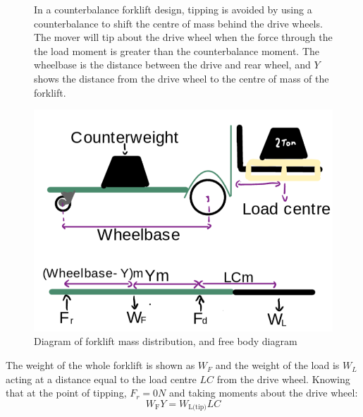 \documentclass[12pt,titlepage]{article}
\begin{document}
\begin{figure}[H]
    \centering
    \begin{minipage}[t]{0.57\textwidth}
        \vspace{0pt} %
        In a counterbalance forklift design, tipping is avoided by using a counterbalance to shift the centre of mass behind the drive wheels. The mover will tip about the drive wheel when the force through the the load moment is greater than the counterbalance moment. The wheelbase is the distance between the drive and rear wheel, and \( Y \) shows the distance from the drive wheel to the centre of mass of the forklift. 
    \end{minipage}%
    \hfill
    \begin{minipage}[t]{0.38\textwidth}
        \vspace{-30pt} 
        \centering
        \includegraphics[width=\linewidth]{Tipping Calculations 3.png}
        \vspace{-30pt}
        \caption{Diagram of forklift mass distribution, and free body diagram}
        \label{fig:x}
    \end{minipage}
\end{figure}
The weight of the whole forklift is shown as \(W_F\) and the weight of the load is \(W_L\) acting at a distance equal to the load centre \(LC\) from the drive wheel. Knowing that at the point of tipping, $F_r = 0N$ and taking moments about the drive wheel:
\vspace{-17pt}
\begin{equation}
    W_{\text{F}}Y = W_{\text{L(tip)}}LC
\end{equation}
\vspace{-47pt}
\end{document}
